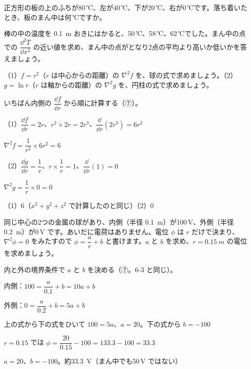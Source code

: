 \begingroup{}%
\noindent\begin{minipage}[t]{0.49\linewidth}
\begin{jibun}
\raggedright 正方形の板の上のふちが80\,℃、左が40\,℃、下が20\,℃、右が0\,℃です。落ち着いたとき、板のまん中は何\,℃ですか。
\end{jibun}
\end{minipage}\hfill
\begin{minipage}[t]{0.49\linewidth}
\begin{jibun}
\raggedright 棒の中の温度を \qty{0.1}{m} おきにはかると、50\,℃、58\,℃、62\,℃でした。まん中の点での $\dfrac{\dd^2T}{\dd x^2}$ の近い値を求め、まん中の点がとなり2点の平均より高いか低いかを答えましょう。
\end{jibun}
\end{minipage}\par
\endgroup

\begin{reidai}[球・円柱の式で計算する]
（1）$f=r^2$（$r$ は中心からの距離）の $\nabla^2f$ を、球の式で求めましょう。（2）$g=\ln r$（$r$ は軸からの距離）の $\nabla^2g$ を、円柱の式で求めましょう。\par
\kangaekata いちばん内側の $\dfrac{\dd f}{\dd r}$ から順に計算する（⑦）。\par
\shiki（1）$\dfrac{\dd f}{\dd r}=2r$、$r^2\times2r=2r^3$、$\dfrac{\dd}{\dd r}(2r^3)=6r^2$\par
\kviiimq $\nabla^2f=\dfrac{1}{r^2}\times6r^2=6$\par
\kviiimq（2）$\dfrac{\dd g}{\dd r}=\dfrac{1}{r}$、$r\times\dfrac{1}{r}=1$、$\dfrac{\dd}{\dd r}(1)=0$\par
\kviiimq $\nabla^2g=\dfrac{1}{r}\times0=0$\par
\kotae（1）6（$x^2+y^2+z^2$ で計算したのと同じ）\quad（2）0
\end{reidai}

\begin{reidai}[同じ中心の球のあいだの電位]
同じ中心の2つの金属の球があり、内側（半径 \qty{0.1}{m}）が100\,V、外側（半径 \qty{0.2}{m}）が0\,V です。あいだに電荷はありません。電位 $\phi$ は $r$ だけで決まり、$\nabla^2\phi=0$ をみたすので $\phi=\dfrac{a}{r}+b$ と書けます。$a$ と $b$ を求め、$r=\qty{0.15}{m}$ の電位を求めましょう。\par
\kangaekata 内と外の境界条件で $a$ と $b$ を決める（⑦。6-3 と同じ）。\par
\shiki 内側：$100=\dfrac{a}{0.1}+b=10a+b$\par
\kviiimq 外側：$0=\dfrac{a}{0.2}+b=5a+b$\par
\kviiimq 上の式から下の式をひいて $100=5a$、$a=20$。下の式から $b=-100$\par
\kviiimq $r=0.15$ では $\phi=\dfrac{20}{0.15}-100=133.3-100=33.3$\par
\kotae $a=20$、$b=-100$。約\qty{33.3}{V}（まん中でも50\,V ではない）
\end{reidai}


